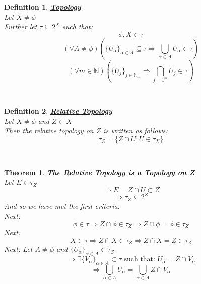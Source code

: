 \documentclass[12pt]{extarticle}
\theoremstyle{plain}
\newtheorem{thm}{Theorem}[section]
\theoremstyle{plain}
\theoremstyle{plain}
\theoremstyle{Definition}
\newtheorem{def.}{Definition}[section]
\theoremstyle{Definition}
\theoremstyle{plain}
\theoremstyle{plain}
\newcommand{\cut}[0]{\noindent\framebox[\linewidth]{\rule{\linewidth}{2pt}}\\}
\begin{document}
\begin{def.} \underline{\textbf{Topology}} \\
	Let $X \not = \phi$ \\ 
	Further let $\tau \subseteq 2^X$ such that: \\ 
	$$\phi,X \in \tau$$
	$$(\forall A \not = \phi)\left(\{U_\alpha\}_{\alpha \in A} \subseteq \tau \Rightarrow \bigcup_{\alpha \in A} U_\alpha \in \tau\right)$$
	$$(\forall m \in \mathbb{N})\left(\{U_j\}_{j\in \mathbb{N}_m} \Rightarrow \bigcap_{j=1^m} U_j \in \tau\right)$$
\end{def.}
\cut
\begin{def.} \underline{\textbf{Relative Topology}} \\
	Let $X \not = \phi$ and $Z \subset X$ \\ 
	Then the relative topology on $Z$ is written as follows: \\ 
	$$\tau_Z = \{Z \cap U : U \in \tau_X\}$$
\end{def.}
\cut
\begin{thm} \underline{\textbf{The Relative Topology is a Topology on Z}} \\
	Let $E \in \tau_Z$ \\
	$$\Rightarrow E = Z \cap U \subset Z$$
	$$\Rightarrow \tau_Z \subseteq 2^Z$$
	And so we have met the first criteria. \\ 
	Next: 
	$$\phi \in \tau \Rightarrow Z \cap \phi \in \tau_Z \Rightarrow Z \cap \phi = \phi \in \tau_Z$$
	Next: 
	$$X \in \tau \Rightarrow Z \cap X \in \tau_Z \Rightarrow Z \cap X = Z \in \tau_Z$$
	Next: 
	Let $A \not = \phi$ and $\{U_\alpha\}_{\alpha \in A} \in \tau_Z$ \\ 
	$$\Rightarrow \exists \{V_\alpha\}_{\alpha \in A} \subset \tau \text{ such that: } U_\alpha = Z \cap V_\alpha$$
	$$\Rightarrow \bigcup_{\alpha \in A} U_\alpha = \bigcup_{\alpha \in A} Z \cap V_\alpha$$
\end{thm}
\cut
\end{document}
